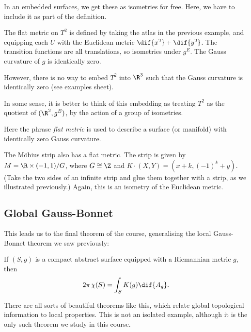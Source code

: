 In an embedded surfaces, we get these as isometries for free. Here, we have to include it as part of the definition.

\begin{example}
	The flat metric on $T^2$ is defined by taking the atlas in the previous example, and equipping each $U$ with the Euclidean metric $\dif{x^2} + \dif{y^2}$. The transition functions are all translations, so isometries under $g^E$. The Gauss curvature of $g$ is identically zero.

	However, there is no way to embed $T^2$ into $\R^3$ such that the Gauss curvature is identically zero (see examples sheet).

	In some sense, it is better to think of this embedding as treating $T^2$ as the quotient of $(\R^2, g^E)$, by the action of a group of isometries.
\end{example}

Here the phrase \emph{flat metric} is used to describe a surface (or manifold) with identically zero Gauss curvature.

\begin{example}
	The Möbius strip also has a flat metric. The strip is given by $M=\R\times (-1,1)/G$, where $G\cong \Z$ and $K\cdot(X,Y) = (x+k, \left( -1 \right)^k + y)$. (Take the two sides of an infinite strip and glue them together with a strip, as we illustrated previously.) Again, this is an isometry of the Euclidean metric.
\end{example}


	\pagebreak

\subsection{Global Gauss-Bonnet} %
\label{sub:global_gauss_bonnet}

This leads us to the final theorem of the course, generalising the local Gauss-Bonnet theorem we saw previously:

\begin{theorem}
	If $(S,g)$ is a compact abstract surface equipped with a Riemannian metric $g$, then
	\begin{equation*}
		2\pi \,\chi(S) = \int_S K(g) \dif{A_g}.
	\end{equation*}
\end{theorem}

There are all sorts of beautiful theorems like this, which relate global topological information to local properties. This is not an isolated example, although it is the only such theorem we study in this course.

